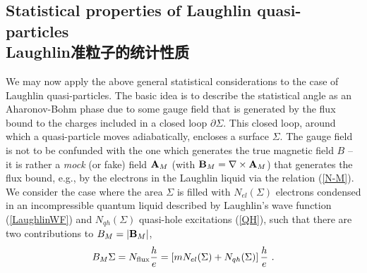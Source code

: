 \documentclass[10pt]{book}
\newcommand{\bA}{{\bf A}}
\newcommand{\bB}{{\bf B}}
\newcommand{\beq}{\begin{equation}}
\newcommand{\eeq}{\end{equation}}
\begin{document}
\subsection[Laughlin准粒子的统计性质]{Statistical properties of Laughlin quasi-particles\\\bf Laughlin准粒子的统计性质}

We may now apply the above general statistical considerations to the case of Laughlin quasi-particles. The basic
idea is to describe the statistical angle as an Aharonov-Bohm phase due to some gauge field that is generated by the
flux bound to the charges included in a closed loop $\partial \Sigma$. This closed loop, around which a quasi-particle
moves adiabatically, encloses a surface $\Sigma$. 
The gauge field is not to be confunded with the one which generates the true magnetic field $B$ -- it 
is rather a {\sl mock} (or fake) field $\bA_M$ (with $\bB_M=\nabla\times \bA_M$)
that generates the flux bound, e.g., by the electrons in the Laughlin liquid via the relation (\ref{N-M}).
We consider the case where the area $\Sigma$ is filled with $N_{el}(\Sigma)$ electrons condensed in 
an incompressible quantum liquid described by Laughlin's
wave function (\ref{LaughlinWF}) and $N_{qh}(\Sigma)$ quasi-hole excitations (\ref{QH}), 
such that there are two contributions to $B_M=|\bB_M|$,
\beq\label{Bmock}
B_M\Sigma = N_{\rm flux}\frac{h}{e} = \left[m N_{el}(\Sigma) + N_{qh}(\Sigma)\right]\frac{h}{e}\ .
\eeq
\end{document}
